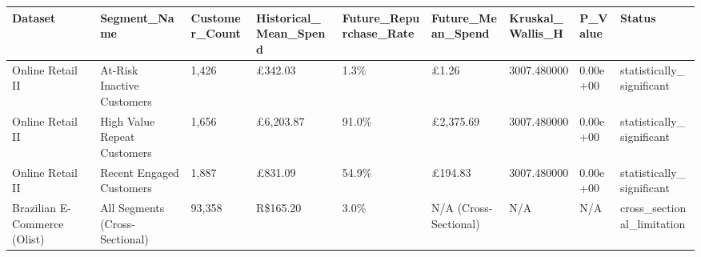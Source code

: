\begin{tabular}{lllllllll}
\toprule
Dataset & Segment\_Name & Customer\_Count & Historical\_Mean\_Spend & Future\_Repurchase\_Rate & Future\_Mean\_Spend & Kruskal\_Wallis\_H & P\_Value & Status \\
\midrule
Online Retail II & At-Risk Inactive Customers & 1,426 & £342.03 & 1.3\% & £1.26 & 3007.480000 & 0.00e+00 & statistically\_significant \\
Online Retail II & High Value Repeat Customers & 1,656 & £6,203.87 & 91.0\% & £2,375.69 & 3007.480000 & 0.00e+00 & statistically\_significant \\
Online Retail II & Recent Engaged Customers & 1,887 & £831.09 & 54.9\% & £194.83 & 3007.480000 & 0.00e+00 & statistically\_significant \\
Brazilian E-Commerce (Olist) & All Segments (Cross-Sectional) & 93,358 & R\$165.20 & 3.0\% & N/A (Cross-Sectional) & N/A & N/A & cross\_sectional\_limitation \\
\bottomrule
\end{tabular}
